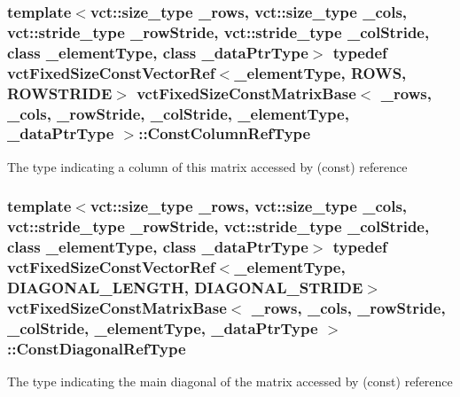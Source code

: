 \subsubsection[{Const\+Column\+Ref\+Type}]{\setlength{\rightskip}{0pt plus 5cm}template$<$vct\+::size\+\_\+type \+\_\+rows, vct\+::size\+\_\+type \+\_\+cols, vct\+::stride\+\_\+type \+\_\+row\+Stride, vct\+::stride\+\_\+type \+\_\+col\+Stride, class \+\_\+element\+Type, class \+\_\+data\+Ptr\+Type$>$ typedef {\bf vct\+Fixed\+Size\+Const\+Vector\+Ref}$<$\+\_\+element\+Type, {\bf R\+O\+W\+S}, {\bf R\+O\+W\+S\+T\+R\+I\+D\+E}$>$ {\bf vct\+Fixed\+Size\+Const\+Matrix\+Base}$<$ \+\_\+rows, \+\_\+cols, \+\_\+row\+Stride, \+\_\+col\+Stride, \+\_\+element\+Type, \+\_\+data\+Ptr\+Type $>$\+::{\bf Const\+Column\+Ref\+Type}}\label{classvct_fixed_size_const_matrix_base_a68ed47f84a2855832fa0c18fafda6843}
The type indicating a column of this matrix accessed by (const) reference \hypertarget{classvct_fixed_size_const_matrix_base_a54699d7dbe28072365fab4aa99c68d66}{}
\subsubsection[{Const\+Diagonal\+Ref\+Type}]{\setlength{\rightskip}{0pt plus 5cm}template$<$vct\+::size\+\_\+type \+\_\+rows, vct\+::size\+\_\+type \+\_\+cols, vct\+::stride\+\_\+type \+\_\+row\+Stride, vct\+::stride\+\_\+type \+\_\+col\+Stride, class \+\_\+element\+Type, class \+\_\+data\+Ptr\+Type$>$ typedef {\bf vct\+Fixed\+Size\+Const\+Vector\+Ref}$<$\+\_\+element\+Type, {\bf D\+I\+A\+G\+O\+N\+A\+L\+\_\+\+L\+E\+N\+G\+T\+H}, {\bf D\+I\+A\+G\+O\+N\+A\+L\+\_\+\+S\+T\+R\+I\+D\+E}$>$ {\bf vct\+Fixed\+Size\+Const\+Matrix\+Base}$<$ \+\_\+rows, \+\_\+cols, \+\_\+row\+Stride, \+\_\+col\+Stride, \+\_\+element\+Type, \+\_\+data\+Ptr\+Type $>$\+::{\bf Const\+Diagonal\+Ref\+Type}}\label{classvct_fixed_size_const_matrix_base_a54699d7dbe28072365fab4aa99c68d66}
The type indicating the main diagonal of the matrix accessed by (const) reference \hypertarget{classvct_fixed_size_const_matrix_base_a41d41a9a3dc6d0c8e36348a8c2fc83db}{}
